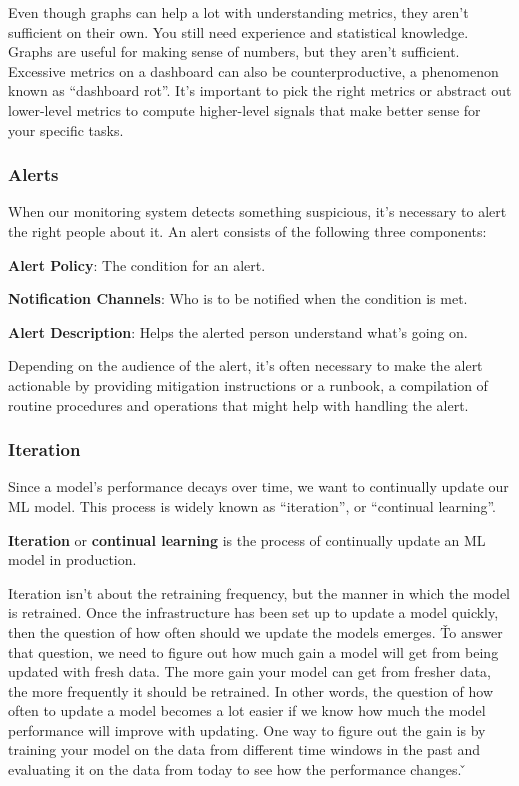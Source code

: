 Even though graphs can help a lot with understanding metrics, they aren't sufficient on their own. You still need
experience and statistical knowledge. Graphs are useful for making sense of numbers, but they aren't sufficient.
Excessive metrics on a dashboard can also be counterproductive, a phenomenon known as ``dashboard rot''. It's
important to pick the right metrics or abstract out lower-level metrics to compute higher-level signals that make
better sense for your specific tasks.

\subsubsection*{Alerts}

When our monitoring system detects something suspicious, it's necessary to alert the right people about it. An alert
consists of the following three components:
\bit
\item \textbf{Alert Policy}: The condition for an alert.
\item \textbf{Notification Channels}: Who is to be notified when the condition is met.
\item \textbf{Alert Description}: Helps the alerted person understand what's going on.
\eit

Depending on the audience of the alert, it's often necessary to make the alert actionable by providing mitigation
instructions or a runbook, a compilation of routine procedures and operations that might help with handling the alert.

\subsubsection{Iteration}

Since a model's performance decays over time, we want to continually update our ML model. This process
is widely known as ``iteration'', or ``continual learning''.

\textbf{Iteration} or \textbf{continual learning} is the process of continually update an ML model in production.
\ed

Iteration isn't about the retraining frequency, but the manner in which the model is retrained. Once the
infrastructure has been set up to update a model quickly, then the question of how often should we update the models
emerges. \v

To answer that question, we need to figure out how much gain a model will get from being updated with fresh data. The
more gain your model can get from fresher data, the more frequently it should be retrained. In other words, the
question of how often to update a model becomes a lot easier if we know how much the model performance will improve
with updating. One way to figure out the gain is by training your model on the data from different time windows in
the past and evaluating it on the data from today to see how the performance changes. \v

